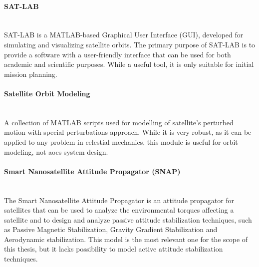         \paragraph*{SAT-LAB}\hspace{0pt}\\
            SAT-LAB is a MATLAB-based Graphical User Interface (GUI), developed for simulating and visualizing satellite orbits. The primary purpose of SAT-LAB is to provide a software with a user-friendly interface that can be used for both academic and scientific purposes. While a useful tool, it is only suitable for initial mission planning.\cite{satlab}

        \paragraph*{Satellite Orbit Modeling}\hspace{0pt}\\
            A collection of MATLAB scripts used for modelling of satellite's perturbed motion with special perturbations approach. While it is very robust, as it can be applied to any problem in celestial mechanics, this module is useful for orbit modeling, not \ac{aocs} system design.\cite{som-matlab}
            
        \paragraph*{Smart Nanosatellite Attitude Propagator (SNAP)}\hspace{0pt}\\
            The Smart Nanosatellite Attitude Propagator is an attitude propagator for satellites that can be used to analyze the environmental torques affecting a satellite and to design and analyze passive attitude stabilization techniques, such as Passive Magnetic Stabilization, Gravity Gradient Stabilization and Aerodynamic stabilization. This model is the most relevant one for the scope of this thesis, but it lacks possibility to model active attitude stabilization techniques.


